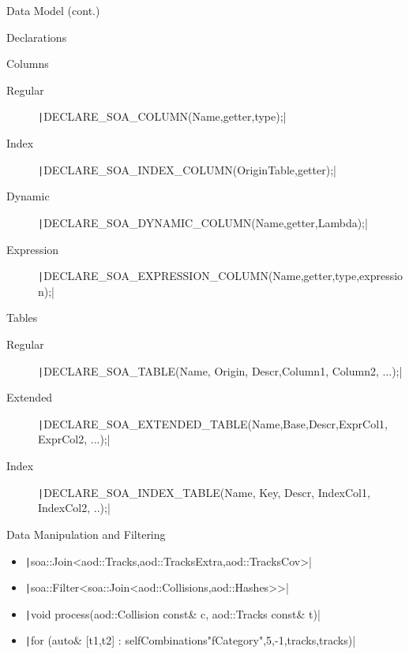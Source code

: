\documentclass[10pt,lualatex,xcolor={table,svgnames},{hyperref={bookmarks=true,linktoc=all}},aspectratio=169]{beamer}
\newcommand{\codeline}[1]{{\texttt|#1|}}
\begin{document}
\begin{frame}{Data Model (cont.)}%
   \centering \resizebox{!}{0.5\linewidth}{\hspace{-2ex}}%
\end{frame}

\begin{frame}{Declarations}
\begin{block}{Columns}
    \begin{description}
        \item[Regular] \codeline{DECLARE_SOA_COLUMN(Name,getter,type);}
        \item[Index] \codeline{DECLARE_SOA_INDEX_COLUMN(OriginTable,getter);}
        \item[Dynamic] \codeline{DECLARE_SOA_DYNAMIC_COLUMN(Name,getter,Lambda);}
        \item[Expression] \codeline{DECLARE_SOA_EXPRESSION_COLUMN(Name,getter,type,expression);}
    \end{description}
\end{block}%
\vspace{2ex}
	\begin{block}{Tables}
    \begin{description}
        \item[Regular] \codeline{DECLARE_SOA_TABLE(Name, Origin, Descr,Column1, Column2, ...);}
        \item[Extended] \codeline{DECLARE_SOA_EXTENDED_TABLE(Name,Base,Descr,ExprCol1, ExprCol2, ...);}
        \item[Index] \codeline{DECLARE_SOA_INDEX_TABLE(Name, Key, Descr, IndexCol1, IndexCol2, ..);}
    \end{description}
    \smallskip
\end{block}
\end{frame}

\begin{frame}{Data Manipulation and Filtering}
    \begin{block}{}
        \centering\resizebox{\linewidth}{!}{}
    \end{block}
    \begin{block}{}
        \begin{itemize}
            \item {\codeline{soa::Join<aod::Tracks,aod::TracksExtra,aod::TracksCov>}}
            \item {\codeline{soa::Filter<soa::Join<aod::Collisions,aod::Hashes>>}}
            \item {\codeline{void process(aod::Collision const& c, aod::Tracks const& t)}}
            \item {\codeline{for (auto& [t1,t2] : selfCombinations{"fCategory",5,-1,tracks,tracks})}}
        \end{itemize}
    \end{block}
\end{frame}
\end{document}
